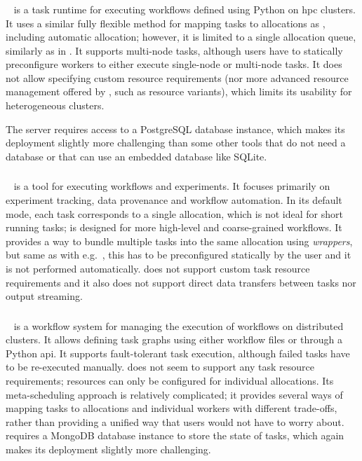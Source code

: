 \subsubsection*{\balsam}
\balsam~\cite{balsam} is a task runtime for executing workflows defined using Python on
\gls{hpc} clusters. It uses a similar fully flexible method for mapping tasks to
allocations as \hyperqueue{}, including automatic allocation; however, it is limited to a
single allocation queue, similarly as in \dask{}. It supports multi-node tasks,
although users have to statically preconfigure workers to either execute single-node or multi-node
tasks. It does not allow specifying custom resource requirements (nor more advanced resource
management offered by \hyperqueue{}, such as resource variants), which limits its
usability for heterogeneous clusters.

The \balsam{} server requires access to a PostgreSQL database instance, which makes
its deployment slightly more challenging than some other tools that do not need a database or that
can use an embedded database like SQLite.

\subsubsection*{\autosubmit}
\autosubmit~\cite{autosubmit} is a tool for executing workflows and experiments. It focuses
primarily on experiment tracking, data provenance and workflow automation. In its default mode,
each task corresponds to a single allocation, which is not ideal for short running tasks;
\autosubmit is designed for more high-level and coarse-grained workflows. It provides a way to
bundle multiple tasks into the same allocation using \emph{wrappers}, but same as with
e.g.\ \pegasus{}, this has to be preconfigured statically by the user and it is not
performed automatically. \autosubmit{} does not support custom task resource requirements
and it also does not support direct data transfers between tasks nor output streaming.

\subsubsection*{\fireworks}
\fireworks~\cite{fireworks} is a workflow system for managing the execution of workflows on
distributed clusters. It allows defining task graphs using either workflow files or through a
Python \gls{api}. It supports fault-tolerant task execution, although failed tasks
have to be re-executed manually. \fireworks{} does not seem to support any task resource
requirements; resources can only be configured for individual allocations. Its meta-scheduling
approach is relatively complicated; it provides several ways of mapping tasks to allocations and
individual workers with different trade-offs, rather than providing a unified way that users would
not have to worry about. \fireworks{} requires a MongoDB database instance to store the
state of tasks, which again makes its deployment slightly more challenging.

